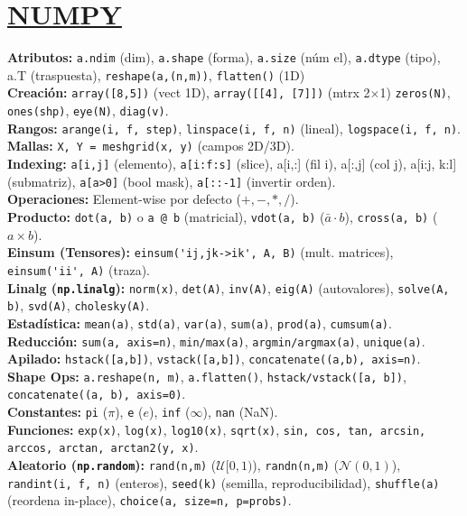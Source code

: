  \section{\href{https://numpy.org/}{NUMPY} }
  \textbf{Atributos:} \texttt{a.ndim} (dim), \texttt{a.shape} (forma), \texttt{a.size} (núm el), \texttt{a.dtype} (tipo), a.T (traspuesta), \texttt{reshape(a,(n,m))}, \texttt{flatten()} (1D) \\
\textbf{Creación:} \texttt{array([8,5])} (vect 1D), \texttt{array([[4],\,[7]])} (mtrx 2$\times$1) \texttt{zeros(N)}, \texttt{ones(shp)}, \texttt{eye(N)}, \texttt{diag(v)}. \\
\textbf{Rangos:} \texttt{arange(i, f, step)}, \texttt{linspace(i, f, n)} (lineal), \texttt{logspace(i, f, n)}. \\
\textbf{Mallas:} \texttt{X, Y = meshgrid(x, y)} (campos 2D/3D). \\
\textbf{Indexing:} \texttt{a[i,j]} (elemento), \texttt{a[i:f:s]} (slice), a[i,:] (fil i), a[:,j] (col j), a[i:j, k:l]  (submatriz), \texttt{a[a>0]} (bool mask), \texttt{a[::-1]} (invertir orden). \\
\textbf{Operaciones:} Element-wise por defecto ($+, -, *, /$). \\
\textbf{Producto:} \texttt{dot(a, b)} o \texttt{a @ b} (matricial), \texttt{vdot(a, b)} ($\bar{a} \cdot b$), \texttt{cross(a, b)} ($a \times b$). \\
\textbf{Einsum (Tensores):} \verb|einsum('ij,jk->ik', A, B)| (mult. matrices), \verb|einsum('ii', A)| (traza). \\
\textbf{Linalg (\texttt{np.linalg}):} \texttt{norm(x)}, \texttt{det(A)}, \texttt{inv(A)}, \texttt{eig(A)} (autovalores), \texttt{solve(A, b)}, \texttt{svd(A)}, \texttt{cholesky(A)}. \\
 \textbf{Estadística:} \texttt{mean(a)}, \texttt{std(a)}, \texttt{var(a)}, \texttt{sum(a)}, \texttt{prod(a)}, \texttt{cumsum(a)}. \\
\textbf{Reducción:} \texttt{sum(a, axis=n)}, \texttt{min/max(a)}, \texttt{argmin/argmax(a)}, \texttt{unique(a)}. \\
 \textbf{Apilado:} \texttt{hstack([a,b])}, \texttt{vstack([a,b])}, \texttt{concatenate((a,b), axis=n)}. \\
\textbf{Shape Ops:} \texttt{a.reshape(n, m)},
\texttt{a.flatten()},
\texttt{hstack/vstack([a, b])}, \texttt{concatenate((a, b), axis=0)}.  \\
\textbf{Constantes:} \texttt{pi} ($\pi$), \texttt{e} ($e$), \texttt{inf} ($\infty$), \texttt{nan} (NaN). \\
 \textbf{Funciones:} \texttt{exp(x)}, \texttt{log(x)}, \texttt{log10(x)}, \texttt{sqrt(x)}, \texttt{sin, cos, tan, arcsin, arccos, arctan, arctan2(y, x)}.\\
\textbf{Aleatorio (\texttt{np.random}):}
\texttt{rand(n,m)} ($\mathcal{U}[0,1)$), \texttt{randn(n,m)} ($\mathcal{N}(0,1)$),
\texttt{randint(i, f, n)} (enteros),
 \texttt{seed(k)} (semilla, reproducibilidad), \texttt{shuffle(a)} (reordena in-place), \texttt{choice(a, size=n, p=probs)}. \\




